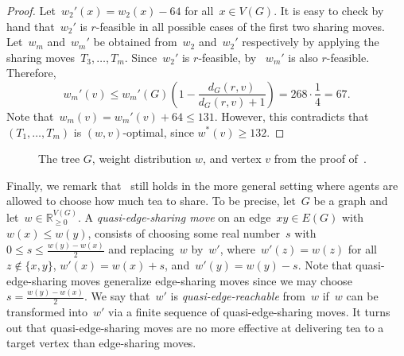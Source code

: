 \documentclass[reqno, 12pt]{amsart}
\numberwithin{equation}{section}
\numberwithin{figure}{section}
\theoremstyle{plain}
\theoremstyle{definition}
\newcommand*{\weights}{\ensuremath{\mathbb{R}_{\geq 0}^{V(G)}}}
\begin{document}
\begin{proof}
        Let~${w_2'(x) = w_2(x)-64}$ for all~${x \in V(G)}$. 
        It is easy to check by hand that~${w_2'}$ is $r$-feasible in all possible cases of the first two sharing moves.
        Let~$w_m$ and~$w_m'$ be obtained from~$w_2$ and~$w_2'$ respectively by applying the sharing moves~${T_3, \dots, T_m}$. 
        Since~$w_2'$ is $r$-feasible, by~ $w_m'$ is also $r$-feasible. 
        Therefore, 
        \[
            w_m'(v) 
            \leq w_m'(G)\left(1- \frac{d_G(r,v)}{d_G(r,v)+1}\right) 
            = 268 \cdot \frac{1}{4}
            = 67. 
        \]
        Note that~${w_m(v) = w_m'(v)+64 \leq 131}$. 
        However, this contradicts that~${(T_1, \dots, T_m)}$ is $(w, v)$-optimal, since $w^*(v) \geq 132$.
\end{proof}

\begin{figure}[htbp]
    \begin{center}
    \end{center}
    \caption{The tree $G$, weight distribution $w$, and vertex $v$ from the proof of~.}
    \label{fig:counterexample}
 \end{figure}

Finally, we remark that~ still holds in the more general setting where agents are allowed to choose how much tea to share.  
To be precise, let~$G$ be a graph and let~${w \in \weights}$. 
A \emph{quasi-edge-sharing move} on an edge~${xy \in E(G)}$ with~${w(x) \leq w(y)}$, consists of choosing some real number~$s$ with~${0 \leq s \leq \frac{w(y)-w(x)}{2}}$ and replacing~$w$ by~$w'$, 
where~${w'(z)=w(z)}$ for all~${z \notin \{x,y\}}$, ${w'(x)=w(x)+s}$, and~${w'(y)=w(y)-s}$. 
Note that quasi-edge-sharing moves generalize edge-sharing moves since we may choose~${s = \frac{w(y)-w(x)}{2}}$. 
We say that~$w'$ is \emph{quasi-edge-reachable} from~$w$ if~$w$ can be transformed into~$w'$ via a finite sequence of quasi-edge-sharing moves. 
It turns out that quasi-edge-sharing moves are no more effective at delivering tea to a target vertex than edge-sharing moves.
\end{document}

